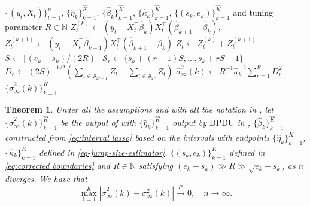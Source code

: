\documentclass[11pt]{article}
\theoremstyle{plain}
\newtheorem{theorem}{Theorem}
\theoremstyle{definition}
\begin{document}
\begin{algorithm}[ht]
\begin{algorithmic}
    \INPUT $\{(y_t, X_t)\}_{t = 1}^n$, $\{\widehat{\eta}_k\}_{k = 1}^{\widehat{K}}$, $\{\widehat{\beta}_k\}_{k = 1}^{\widehat{K}}$, $\{\widehat{\kappa}_k\}_{k = 1}^{\widehat{K}}$,  $\{(s_k, e_k)\}_{k = 1}^{\widehat{K}}$ and tuning parameter $R \in \mathbb{N}$
            \State $Z_t^{(k)} \leftarrow (y_t - X_t^{\top}\widehat{\beta}_k)X_t^{\top}(\widehat{\beta}_{k+1} - \widehat{\beta}_k)$, $Z_t^{(k+1)} \leftarrow (y_t - X_t^{\top}\widehat{\beta}_{k+1})X_t^{\top}(\widehat{\beta}_{k+1} - \widehat{\beta}_k)$
            \State $Z_t \leftarrow Z_t^{(k)} + Z_t^{(k+1)}$
        \EndFor
        \State $S \leftarrow \lfloor (e_k - s_k)/(2R)\rfloor$
            \State $\mathcal{S}_r \leftarrow \{s_k + (r-1)S, \ldots, s_k + rS - 1\}$
        \EndFor
            \State $D_r \leftarrow (2S)^{-1/2} (\sum_{t \in \mathcal{S}_{2r-1}} Z_t - \sum_{t \in \mathcal{S}_{2r}} Z_t)$
        \EndFor
        \State $\widehat{\sigma}_{\infty}^2(k) \leftarrow R^{-1} \widehat{\kappa}_k^{-2} \sum_{r = 1}^R D_r^2$
    \EndFor
    \OUTPUT $\{\widehat{\sigma}_{\infty}^2(k)\}_{k = 1}^{\widehat{K}}$
\caption{Long-run variance estimators} \label{alg-lrv-est}
\end{algorithmic}
\end{algorithm} 

\begin{theorem}\label{thm:lrv_consist}
Under all the assumptions and with all the notation in , let $\{\widehat{\sigma}_{\infty}^2(k)\}_{k = 1}^{\widehat{K}}$ be the output of  with $\{\widehat{\eta}_k\}_{k = 1}^{\widehat{K}}$ output by $\mathrm{DPDU}$ in , $\{\widehat{\beta}_k\}_{k = 1}^{\widehat{K}}$ constructed from \eqref{eq:interval lasso} based on the intervals with endpoints $\{\widehat{\eta}_k\}_{k = 1}^{\widehat{K}}$, $\{\widehat{\kappa}_k\}_{k = 1}^{\widehat{K}}$ defined in \eqref{eq-jump-size-estimator}, $\{(s_k, e_k)\}_{k = 1}^{\widehat{K}}$ defined in \eqref{eq:corrected boundaries} and $R \in \mathbb{N}$ satisfying $(e_k - s_k) \gg R \gg \sqrt{e_k - s_k}$, as $n$ diverges.  We have that 
\[
    \max_{k = 1}^K |\widehat{\sigma}_{\infty}^2(k) - \sigma_{\infty}^2(k)| \overset{P.}{\longrightarrow} 0, \quad n \to \infty.
\]
\end{theorem}
\end{document}
